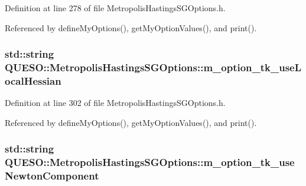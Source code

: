 Definition at line 278 of file Metropolis\-Hastings\-S\-G\-Options.\-h.



Referenced by define\-My\-Options(), get\-My\-Option\-Values(), and print().

\hypertarget{class_q_u_e_s_o_1_1_metropolis_hastings_s_g_options_a8b184b15ebded02f00668b1d0f761a2d}{
\subsubsection[{m\-\_\-option\-\_\-tk\-\_\-use\-Local\-Hessian}]{\setlength{\rightskip}{0pt plus 5cm}std\-::string Q\-U\-E\-S\-O\-::\-Metropolis\-Hastings\-S\-G\-Options\-::m\-\_\-option\-\_\-tk\-\_\-use\-Local\-Hessian\hspace{0.3cm}{\ttfamily [private]}}}\label{class_q_u_e_s_o_1_1_metropolis_hastings_s_g_options_a8b184b15ebded02f00668b1d0f761a2d}


Definition at line 302 of file Metropolis\-Hastings\-S\-G\-Options.\-h.



Referenced by define\-My\-Options(), get\-My\-Option\-Values(), and print().

\hypertarget{class_q_u_e_s_o_1_1_metropolis_hastings_s_g_options_af732a2bed220e834c03802de602025fa}{
\subsubsection[{m\-\_\-option\-\_\-tk\-\_\-use\-Newton\-Component}]{\setlength{\rightskip}{0pt plus 5cm}std\-::string Q\-U\-E\-S\-O\-::\-Metropolis\-Hastings\-S\-G\-Options\-::m\-\_\-option\-\_\-tk\-\_\-use\-Newton\-Component\hspace{0.3cm}{\ttfamily [private]}}}\label{class_q_u_e_s_o_1_1_metropolis_hastings_s_g_options_af732a2bed220e834c03802de602025fa}


